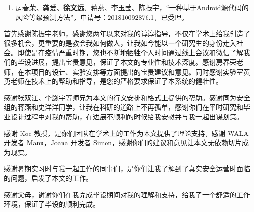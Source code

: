 \documentclass[master]{NJUthesis}
\theoremstyle{plain}
\begin{document}

\begin{enumerate}[label=\arabic*., labelindent=0em, leftmargin=*]
    \item 房春荣、龚爱、\textbf{徐文远}、蒋燕、李玉莹、陈振宇，``一种基于Android源代码的风险等级预测方法''，申请号：201810092876.1，已受理。
\end{enumerate}

\backmatter


\begin{thanks}

\vskip 18pt

首先感谢陈振宇老师，感谢您两年以来对我的谆谆指导，不仅在学术上给我创造了很多机会，更重要的是教会我如何做人，让我如今能以一个研究生的身份走入社会。即使是在疫情严重时期，您也不断地牺牲个人时间通过线上会议和微信了解我们的毕设进展，提出宝贵意见，保证了本文的专业性和技术深度。感谢房春荣老师，在本项目的设计、实验安排等方面提出的宝贵建议和意见。同时感谢实验室黄勇老师在技术上的帮助和指导，是您的严格要求保证了本系统的健壮性。

感谢张双江、李灏宇等师兄为本文的行文安排和格式上提供的帮助。感谢同为安全组的蒋燕和史洋洋同学，让我在科研的道路上不再孤单，感谢你们在平时研究和毕业设计过程中对我的帮助，在进展不顺利的时候给我安慰并与我一起出谋划策。

感谢 Koc 教授，是你们团队在学术上的工作为本文提供了理论支持，感谢 WALA 开发者 Manu，Joana 开发者 Simon，感谢你们的建议和意见让本文无依赖切片成为现实。

感谢暑期实习时与我一起工作的同事们，是你们让我了解到了真实安全运营时面临的问题，启发了本文的工作。

感谢父母，谢谢你们在我完成毕设期间对我的理解和支持，给我了一个舒适的工作环境，保证了毕设的顺利完成。


\end{thanks}

\fi%
\makeatother
\end{document}
